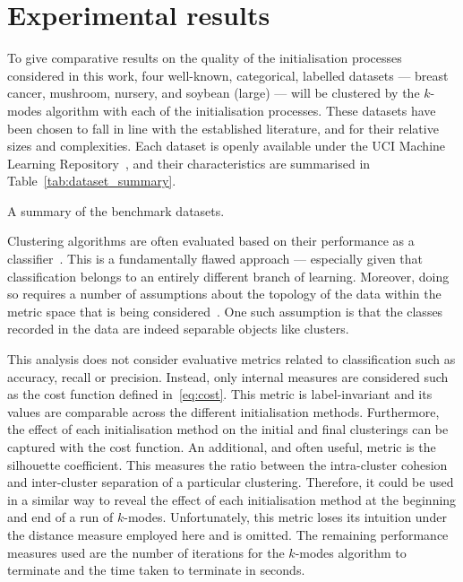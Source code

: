 \section{Experimental results}\label{sec:results}

To give comparative results on the quality of the initialisation processes
considered in this work, four well-known, categorical, labelled datasets ---
breast cancer, mushroom, nursery, and soybean (large) --- will be clustered by
the \(k\)-modes algorithm with each of the initialisation processes. These
datasets have been chosen to fall in line with the established literature, and
for their relative sizes and complexities. Each dataset is openly available
under the UCI Machine Learning Repository~\cite{Dua2019}, and their
characteristics are summarised in Table~\ref{tab:dataset_summary}.

\begin{table}[htbp]
    \resizebox{\textwidth}{!}{%
        
    }\caption{A summary of the benchmark datasets.}\label{tab:dataset_summary}
\end{table}

Clustering algorithms are often evaluated based on their performance as a
classifier~\cite{%
    Arthur2007,Cao2009,Cao2012,Huang1998,Ng2007,Olaode2014,Schaeffer2007%
}. This is a fundamentally flawed approach --- especially given that
classification belongs to an entirely different branch of learning. Moreover,
doing so requires a number of assumptions about the topology of the data within
the metric space that is being considered~\cite{Memoli2011}. One such assumption
is that the classes recorded in the data are indeed separable objects like
clusters.

This analysis does not consider evaluative metrics related to classification
such as accuracy, recall or precision. Instead, only internal measures are
considered such as the cost function defined in~\eqref{eq:cost}. This metric is
label-invariant and its values are comparable across the different
initialisation methods. Furthermore, the effect of each initialisation method
on the initial and final clusterings can be captured with the cost function. An
additional, and often useful, metric is the silhouette coefficient. This
measures the ratio between the intra-cluster cohesion and inter-cluster
separation of a particular clustering. Therefore, it could be used in a similar
way to reveal the effect of each initialisation method at the beginning and end
of a run of \(k\)-modes. Unfortunately, this metric loses its intuition under
the distance measure employed here and is omitted. The remaining performance
measures used are the number of iterations for the \(k\)-modes algorithm to
terminate and the time taken to terminate in seconds.

